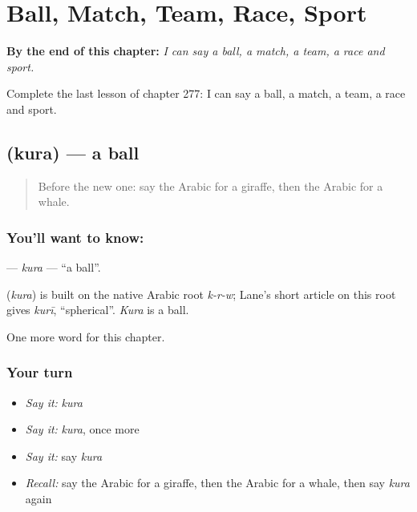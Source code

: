 
\chapter{Ball, Match, Team, Race, Sport}
\label{ch:ar-ball-match-team-race-sport}

\begin{chapteropening}
\textbf{By the end of this chapter:} \emph{I can say a ball, a match, a team, a race and sport.}

Complete the last lesson of chapter 277: I can say a ball, a match, a team, a race and sport.
\end{chapteropening}

\section[\texorpdfstring{\ar{كرة} (kura)}{كرة (kura)}]{ (kura) — a ball}

\label{lesson:AR-C277-kura}



\begin{quote}
Before the new one: say the Arabic for a giraffe, then the Arabic for a whale.
\end{quote}

\subsection*{You'll want to know: }
\textbf{} — \emph{kura} — \textquotedblleft{}a ball\textquotedblright{}.

\begin{cousinweb}
\textbf{} (\emph{kura}) is built on the native Arabic root \emph{k-r-w}; Lane's short article on this root gives \emph{kurī}, \textquotedblleft{}spherical\textquotedblright{}. \emph{Kura} is a ball.
\end{cousinweb}

\begin{grammarlens}[title={What you've built}]
One more word for this chapter.
\end{grammarlens}

\subsection*{Your turn}
\begin{itemize}
\raggedright
  \item \emph{Say it:} \emph{kura}
  \item \emph{Say it:} \emph{kura}, once more
  \item \emph{Say it:} say \emph{kura}
  \item \emph{Recall:} say the Arabic for a giraffe, then the Arabic for a whale, then say \emph{kura} again
\end{itemize}

